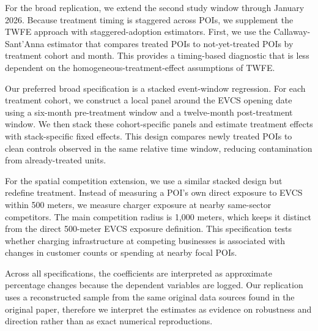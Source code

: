 \documentclass[12pt]{article}
\begin{document}
For the broad replication, we extend the second study window through January 2026. Because treatment timing is staggered across POIs, we supplement the TWFE approach with staggered-adoption estimators. First, we use the Callaway-Sant'Anna estimator that compares treated POIs to not-yet-treated POIs by treatment cohort and month. This provides a timing-based diagnostic that is less dependent on the homogeneous-treatment-effect assumptions of TWFE.

Our preferred broad specification is a stacked event-window regression. For each treatment cohort, we construct a local panel around the EVCS opening date using a six-month pre-treatment window and a twelve-month post-treatment window. We then stack these cohort-specific panels and estimate treatment effects with stack-specific fixed effects. This design compares newly treated POIs to clean controls observed in the same relative time window, reducing contamination from already-treated units.

For the spatial competition extension, we use a similar stacked design but redefine treatment. Instead of measuring a POI’s own direct exposure to EVCS within 500 meters, we measure charger exposure at nearby same-sector competitors. The main competition radius is 1,000 meters, which keeps it distinct from the direct 500-meter EVCS exposure definition. This specification tests whether charging infrastructure at competing businesses is associated with changes in customer counts or spending at nearby focal POIs.

Across all specifications, the coefficients are interpreted as approximate percentage changes because the dependent variables are logged. Our replication uses a reconstructed sample from the same original data sources found in the original paper, therefore we interpret the estimates as evidence on robustness and direction rather than as exact numerical reproductions.


\end{document}
